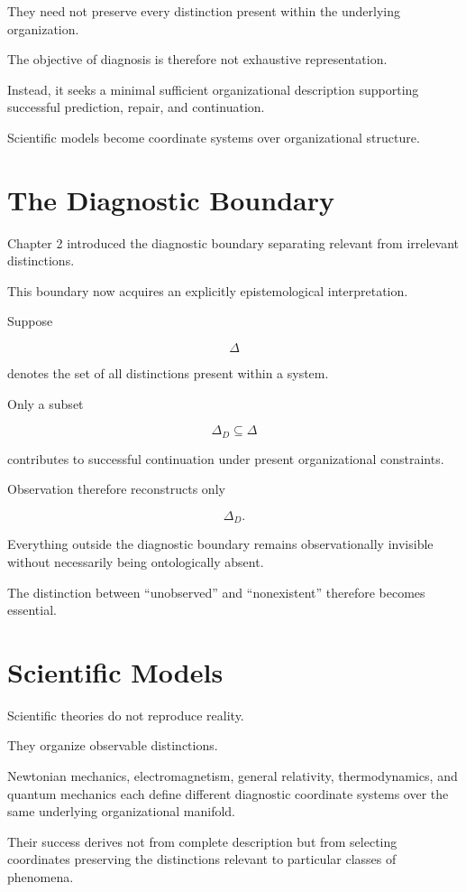 \documentclass[11pt,oneside]{book}
\numberwithin{equation}{chapter}
\theoremstyle{definition}
\theoremstyle{plain}
\begin{document}
They need not preserve every distinction present within the underlying
organization.

The objective of diagnosis is therefore not exhaustive representation.

Instead, it seeks a minimal sufficient organizational description
supporting successful prediction, repair, and continuation.

Scientific models become coordinate systems over organizational structure.

\section{The Diagnostic Boundary}

Chapter 2 introduced the diagnostic boundary separating relevant from
irrelevant distinctions.

This boundary now acquires an explicitly epistemological interpretation.

Suppose

\[
\Delta
\]

denotes the set of all distinctions present within a system.

Only a subset

\[
\Delta_D
\subseteq
\Delta
\]

contributes to successful continuation under present organizational
constraints.

Observation therefore reconstructs only

\[
\Delta_D.
\]

Everything outside the diagnostic boundary remains observationally
invisible without necessarily being ontologically absent.

The distinction between ``unobserved'' and ``nonexistent'' therefore
becomes essential.

\section{Scientific Models}

Scientific theories do not reproduce reality.

They organize observable distinctions.

Newtonian mechanics, electromagnetism, general relativity, thermodynamics,
and quantum mechanics each define different diagnostic coordinate systems
over the same underlying organizational manifold.

Their success derives not from complete description but from selecting
coordinates preserving the distinctions relevant to particular classes of
phenomena.
\end{document}
